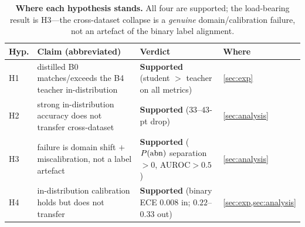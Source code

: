 \begin{table}[tb]
\centering\small
\caption{\textbf{Where each hypothesis stands.} All four are supported; the load-bearing result is
H3---the cross-dataset collapse is a \emph{genuine} domain/calibration failure, not an artefact of
the binary label alignment.}
\label{tab:hyp-status}
\begin{tabular}{@{}l p{} p{} l@{}}
\toprule
Hyp. & Claim (abbreviated) & Verdict & Where \\
\midrule
H1 & distilled B0 matches/exceeds the B4 teacher in-distribution & \textbf{Supported} (student $>$ teacher on all metrics) & \cref{sec:exp} \\
H2 & strong in-distribution accuracy does not transfer cross-dataset & \textbf{Supported} ($33$--$43$-pt drop) & \cref{sec:analysis} \\
H3 & failure is domain shift $+$ miscalibration, not a label artefact & \textbf{Supported} ($P(\mathrm{abn})$ separation $>0$, AUROC$>0.5$) & \cref{sec:analysis} \\
H4 & in-distribution calibration holds but does not transfer & \textbf{Supported} (binary ECE $0.008$ in; $0.22$--$0.33$ out) & \cref{sec:exp,sec:analysis} \\
\bottomrule
\end{tabular}
\end{table}

